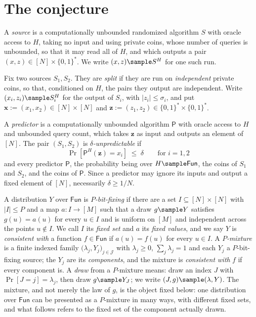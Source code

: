 \documentclass{conjura-conjecture}
\newcommand{\Fun}{\mathsf{Fun}}
\newcommand{\Prob}[1]{\Pr\!\left[#1\right]}
\newcommand{\bits}{\{0,1\}}
\newcommand{\vx}{\mathbf{x}}
\newcommand{\vz}{\mathbf{z}}
\begin{document}
\section{The conjecture}\label{sec:conjectures}

\begin{definition}\label{def:sources}
A \emph{source} is a computationally unbounded randomized algorithm $S$
with oracle access to $H$, taking no input and using private coins, whose
number of queries is unbounded, so that it may read all of $H$, and which
outputs a pair $(x,z) \in [N] \times \bits^{*}$. We write
$(x,z) \sample S^{H}$ for one such run.

Fix two sources $S_1, S_2$. They are \emph{split} if they are run on
\emph{independent} private coins, so that, conditioned on $H$, the pairs
they output are independent. Write $(x_i,z_i) \sample S_i^{H}$ for the
output of $S_i$, with $|z_i| \le \sigma_i$, and put
$\vx := (x_1,x_2) \in [N]\times[N]$ and
$\vz := (z_1,z_2) \in \bits^{*} \times \bits^{*}$.

A \emph{predictor} is a computationally unbounded algorithm $\mathsf{P}$
with oracle access to $H$ and unbounded query count, which takes $\vz$ as
input and outputs an element of $[N]$. The pair $(S_1,S_2)$ is
\emph{$\delta$-unpredictable} if
\[
  \Prob{\mathsf{P}^{H}(\vz) = x_i} \;\le\; \delta
  \qquad\text{for } i = 1,2
\]
and every predictor $\mathsf{P}$, the probability being over
$H \sample \Fun$, the coins of $S_1$ and $S_2$, and the coins of
$\mathsf{P}$. Since a predictor may ignore its inputs and output a fixed
element of $[N]$, necessarily $\delta \ge 1/N$.
\end{definition}

\begin{definition}\label{def:bf}
A distribution $Y$ over $\Fun$ is \emph{$P$-bit-fixing} if there are a set
$I \subseteq [N]\times[N]$ with $|I| \le P$ and a map $a : I \to [M]$ such
that a draw $g \sample Y$ satisfies $g(u) = a(u)$ for every $u \in I$ and
is uniform on $[M]$ and independent across the points $u \notin I$. We call
$I$ its \emph{fixed set} and $a$ its \emph{fixed values}, and we say $Y$ is
\emph{consistent with} a function $f \in \Fun$ if $a(u) = f(u)$ for every
$u \in I$. A \emph{$P$-mixture} is a finite indexed family
$\bigl(\lambda_j, Y_j\bigr)_{j \in \mathcal{J}}$ with $\lambda_j \ge 0$,
$\sum_j \lambda_j = 1$ and each $Y_j$ a $P$-bit-fixing source; the $Y_j$ are
its \emph{components}, and the mixture is \emph{consistent with} $f$ if
every component is. A \emph{draw} from a $P$-mixture means: draw an index
$J$ with $\Prob{J = j} = \lambda_j$, then draw $g \sample Y_J$; we write
$(J,g) \sample (\lambda,Y)$. The mixture, and not merely the law of $g$, is
the object fixed below: one distribution over $\Fun$ can be presented as a
$P$-mixture in many ways, with different fixed sets, and what follows refers
to the fixed set of the component actually drawn.
\end{definition}
\end{document}
